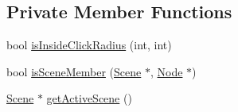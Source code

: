 \subsection*{Private Member Functions}
\begin{DoxyCompactItemize}
\item 
bool \mbox{\hyperlink{classsage_1_1EventDispatcher_a918e15fc278d82e1826c5da31b6cc897}{is\+Inside\+Click\+Radius}} (int, int)
\item 
bool \mbox{\hyperlink{classsage_1_1EventDispatcher_ae76233a36c5bea9afdee715231c30641}{is\+Scene\+Member}} (\mbox{\hyperlink{classsage_1_1Scene}{Scene}} $\ast$, \mbox{\hyperlink{classsage_1_1Node}{Node}} $\ast$)
\item 
\mbox{\hyperlink{classsage_1_1Scene}{Scene}} $\ast$ \mbox{\hyperlink{classsage_1_1EventDispatcher_a360b6c05663a1716b7caad26dbc89279}{get\+Active\+Scene}} ()
\end{DoxyCompactItemize}
